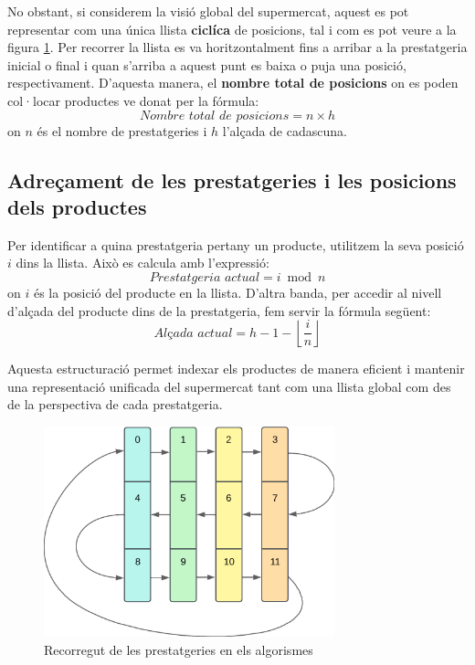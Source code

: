 \documentclass[a4paper,12pt]{report}
\begin{document}
\begin{itemize}
No obstant, si considerem la visió global del supermercat, aquest es pot representar com una única llista \textbf{ciclíca} de posicions, tal i com es pot veure a la figura \ref{fig:shelving_array}. Per recorrer la llista es va horitzontalment fins a arribar a la prestatgeria inicial o final i quan s'arriba a aquest punt es baixa o puja una posició, respectivament.
D'aquesta manera, el \textbf{nombre total de posicions} on es poden col·locar productes ve donat per la fórmula:
\[
	\textit{Nombre total de posicions} = n \times h
\]
on \( n \) és el nombre de prestatgeries i \( h \) l'alçada de cadascuna.

\subsection{Adreçament de les prestatgeries i les posicions dels productes}

Per identificar a quina prestatgeria pertany un producte, utilitzem la seva posició \( i \) dins la llista. Això es calcula amb l'expressió:
\[
	\textit{Prestatgeria actual} = i \bmod n
\]
on \( i \) és la posició del producte en la llista.
\newline
D'altra banda, per accedir al nivell d'alçada del producte dins de la prestatgeria, fem servir la fórmula següent:
\[
	\textit{Alçada actual} = h - 1 - \left\lfloor \frac{i}{n} \right\rfloor
\]

Aquesta estructuració permet indexar els productes de manera eficient i mantenir una representació unificada del supermercat tant com una llista global com des de la perspectiva de cada prestatgeria.


\begin{figure}[H]
	\centering
	\includegraphics[width=0.75\textwidth]{../assets/shelvingUnit_array_diagram.png}
	\caption{Recorregut de les prestatgeries en els algorismes}
	\label{fig:shelving_array}
\end{figure}


\end{itemize}
\end{document}
